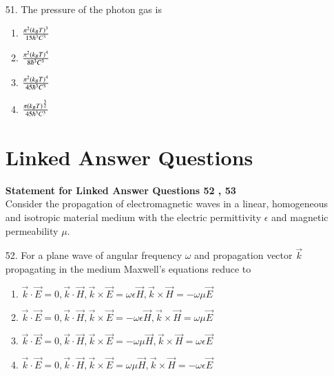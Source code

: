 \documentclass[journal,12pt,onecolumn]{IEEEtran}
\theoremstyle{remark}
\begin{document}
\begin{enumerate}
\begin{enumerate}
\begin{multicols}{2}
\begin{center}
                    \end{center}
            \end{multicols}
            \end{enumerate}

        \item[51.] The pressure of the photon gas is
            \hfill{}
            \begin{enumerate}
                \item $\frac{\pi^2 \left(k_B T\right)^3}{15\hbar ^3 C^3}$
                \item $\frac{\pi^2 \left(k_B T\right)^4}{8\hbar ^3 C^3}$
                \item $\frac{\pi^2 \left(k_B T\right)^4}{45\hbar ^3 C^3}$
                \item $\frac{\pi \left(k_B T\right)^\frac{3}{2}}{45\hbar ^3 C^3}$
            \end{enumerate}

            \section{\textbf{Linked Answer Questions}}
            \textbf{Statement for Linked Answer Questions 52 , 53}\\
            Consider the propagation of electromagnetic waves in a linear, homogeneous and isotropic
            material medium with the electric permittivity $\epsilon$ and magnetic permeability $\mu$.\\
        \item[52.] For a plane wave of angular frequency $\omega$ and propagation vector $\vec{k}$ propagating
            in the medium Maxwell's equations reduce to
            \hfill{}
            \begin{enumerate}
                \item $\vec{k}\cdot \vec{E} = 0, \vec{k}\cdot \vec{H}, \vec{k} \times \vec{E}=\omega\epsilon \vec{H}, \vec{k} \times \vec{H}=-\omega\mu\vec{E}$ 
                \item $\vec{k}\cdot \vec{E} = 0, \vec{k}\cdot \vec{H}, \vec{k} \times \vec{E}=-\omega\epsilon \vec{H}, \vec{k} \times \vec{H}=\omega\mu\vec{E}$ 
                \item $\vec{k}\cdot \vec{E} = 0, \vec{k}\cdot \vec{H}, \vec{k} \times \vec{E}=-\omega\mu \vec{H}, \vec{k} \times \vec{H}=\omega\epsilon\vec{E}$ 
                \item $\vec{k}\cdot \vec{E} = 0, \vec{k}\cdot \vec{H}, \vec{k} \times \vec{E}=\omega\mu \vec{H}, \vec{k} \times \vec{H}=-\omega\epsilon\vec{E}$ 
            \end{enumerate}

    \end{enumerate}
\end{document}
